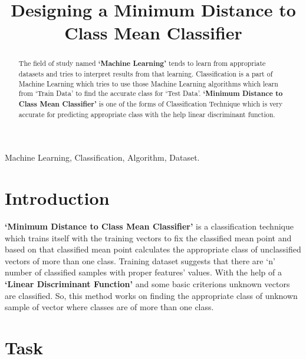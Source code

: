 \documentclass[conference]{IEEEtran}
\begin{document}
\title{Designing a Minimum Distance to Class Mean Classifier\\
}

\author{

}

\maketitle

\begin{abstract}
The field of study named \textbf{‘Machine Learning’} tends to learn from appropriate datasets and tries to interpret results from that learning. Classification is a part of Machine Learning which tries to use those Machine Learning algorithms which learn from ‘Train Data’ to find the accurate class for ‘Test Data’. \textbf{‘Minimum Distance to Class Mean Classifier’} is one of the forms of Classification Technique which is very accurate for predicting appropriate class with the help linear discriminant function.

\end{abstract}

\begin{IEEEkeywords}
Machine Learning, Classification, Algorithm, Dataset.
\end{IEEEkeywords}

\section{Introduction}
\textbf{‘Minimum Distance to Class Mean Classifier’} is a classification technique which trains itself with the training vectors to fix the classified mean point and based on that classified mean point calculates the appropriate class of unclassified vectors of more than one class. Training dataset suggests that there are ‘n’ number of classified samples with proper features’ values. With the help of a \textbf{‘Linear Discriminant Function’} and some basic criterions unknown vectors are classified. So, this method works on finding the appropriate class of unknown sample of vector where classes are of more than one class.


\section{Task}
\end{document}
